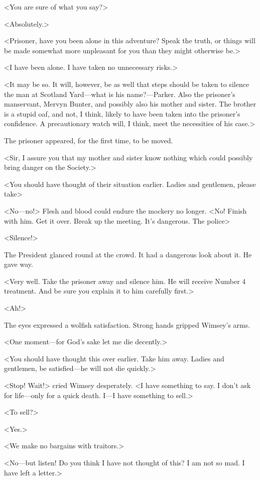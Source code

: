 <You are sure of what you say?>

<Absolutely.>

<Prisoner, have you been alone in this adventure? Speak the truth, or things will be made somewhat more unpleasant for you than they might otherwise be.>

<I have been alone. I have taken no unnecessary risks.>

<It may be so. It will, however, be as well that steps should be taken to silence the man at Scotland Yard—what is his name?—Parker. Also the prisoner's manservant, Mervyn Bunter, and possibly also his mother and sister. The brother is a stupid oaf, and not, I think, likely to have been taken into the prisoner's confidence. A precautionary watch will, I think, meet the necessities of his case.>

The prisoner appeared, for the first time, to be moved.

<Sir, I assure you that my mother and sister know nothing which could possibly bring danger on the Society.>

<You should have thought of their situation earlier. Ladies and gentlemen, please take\longdash>

<No—no!> Flesh and blood could endure the mockery no longer. <No! Finish with him. Get it over. Break up the meeting. It's dangerous. The police\longdash>

<Silence!>

The President glanced round at the crowd. It had a dangerous look about it. He gave way.

<Very well. Take the prisoner away and silence him. He will receive Number 4 treatment. And be sure you explain it to him carefully first.>

<Ah!>

The eyes expressed a wolfish satisfaction. Strong hands gripped Wimsey's arms.

<One moment—for God's sake let me die decently.>

<You should have thought this over earlier. Take him away. Ladies and gentlemen, be satisfied—he will not die quickly.>

<Stop! Wait!> cried Wimsey desperately. <I have something to say. I don't ask for life—only for a quick death. I—I have something to sell.>

<To sell?>

<Yes.>

<We make no bargains with traitors.>

<No—but listen! Do you think I have not thought of this? I am not so mad. I have left a letter.>

